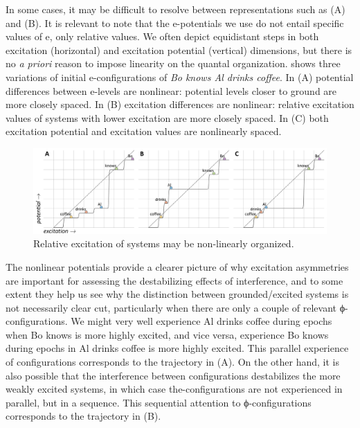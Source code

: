    In some cases, it may be difficult to resolve between representations such as (A) and (B). It is relevant to note that the e-potentials we use do not entail specific values of e, only relative values. We often depict equidistant steps in both excitation (horizontal) and excitation potential (vertical) dimensions, but there is no {\textit{a priori}} reason to impose linearity on the quantal organization. {} shows three variations of initial e-configurations of \textit{Bo knows Al drinks coffee}. In (A) potential differences between e-levels are nonlinear: potential levels closer to ground are more closely spaced. In (B) excitation differences are nonlinear: relative excitation values of systems with lower excitation are more closely spaced. In (C) both excitation potential and excitation values are nonlinearly spaced.

  
\begin{figure}
\includegraphics[width=\textwidth]{figures/Tilsen-img96.png}
\caption{Relative excitation of systems may be non-linearly organized.}
\label{fig:4:46}
\end{figure}
   

  The nonlinear potentials provide a clearer picture of why excitation asymmetries are important for assessing the destabilizing effects of interference, and to some extent they help us see why the distinction between grounded/excited systems is not necessarily clear cut, particularly when there are only a couple of relevant ϕ-configurations. We might very well experience {\textbar}Al drinks coffee{\textbar} during epochs when {\textbar}Bo knows{\textbar} is more highly excited, and vice versa, experience {\textbar}Bo knows{\textbar} during epochs in {\textbar}Al drinks coffee{\textbar} is more highly excited. This parallel experience of configurations corresponds to the trajectory in {}(A). On the other hand, it is also possible that the interference between configurations destabilizes the more weakly excited systems, in which case the-configurations are not experienced in parallel, but in a sequence. This sequential attention to ϕ-configurations corresponds to the trajectory in {}(B).

